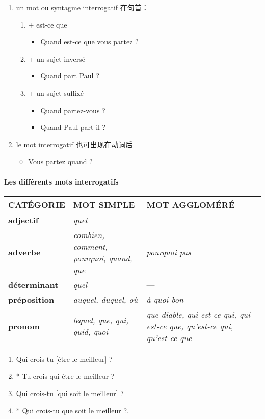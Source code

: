 \documentclass[UTF8]{report}
\begin{document}
\begin{enumerate}
    \item un mot ou syntagme interrogatif 在句首：
    \begin{enumerate}
        \item + est-ce que
        \begin{itemize}
            \item Quand est-ce que vous partez ?
        \end{itemize}
        \item + un sujet inversé
        \begin{itemize}
            \item Quand part Paul ?
        \end{itemize}
        \item + un sujet suffixé
        \begin{itemize}
            \item Quand partez-vous ?
            \item Quand Paul part-il ?
        \end{itemize}
    \end{enumerate}
    \item le mot interrogatif 也可出现在动词后
    \begin{itemize}
        \item Vous partez quand ?
    \end{itemize}
\end{enumerate}


\paragraph{Les différents mots interrogatifs}

\begin{table}[H]
\centering
\renewcommand{\arraystretch}{1.3}
\begin{tabular}{|>{\bfseries}l|p{6cm}|p{6cm}|}
\hline
\rowcolor{cyan!20}
CATÉGORIE & \textbf{MOT SIMPLE} & \textbf{MOT AGGLOMÉRÉ} \\
\hline
adjectif & \textit{quel} & --- \\
\hline
adverbe & \textit{combien, comment, pourquoi, quand, que} & \textit{pourquoi pas} \\
\hline
déterminant & \textit{quel} & --- \\
\hline
préposition & \textit{auquel, duquel, où} & \textit{à quoi bon} \\
\hline
pronom & \textit{lequel, que, qui, quid, quoi} & \textit{que diable, qui est-ce qui, qui est-ce que, qu’est-ce qui, qu’est-ce que} \\
\hline
\end{tabular}
\end{table}
\begin{enumerate}
    \item Qui crois-tu [être le meilleur] ?
    \item * Tu crois qui être le meilleur ?
    \item Qui crois-tu [qui soit le meilleur] ?
    \item * Qui crois-tu que soit le meilleur ?.
\end{enumerate}
\end{document}
